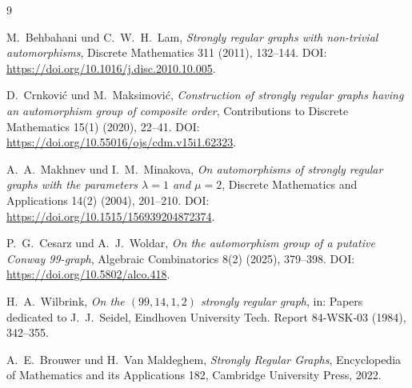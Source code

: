 \documentclass[11pt,a4paper]{article}
\begin{document}
\begin{thebibliography}{9}

M.~Behbahani und C.~W.~H.~Lam,
\emph{Strongly regular graphs with non-trivial automorphisms},
Discrete Mathematics 311 (2011), 132--144.
DOI: \url{https://doi.org/10.1016/j.disc.2010.10.005}.

D.~Crnkovi\'c und M.~Maksimovi\'c,
\emph{Construction of strongly regular graphs having an automorphism group of composite order},
Contributions to Discrete Mathematics 15(1) (2020), 22--41.
DOI: \url{https://doi.org/10.55016/ojs/cdm.v15i1.62323}.

A.~A.~Makhnev und I.~M.~Minakova,
\emph{On automorphisms of strongly regular graphs with the parameters $\lambda=1$ and $\mu=2$},
Discrete Mathematics and Applications 14(2) (2004), 201--210.
DOI: \url{https://doi.org/10.1515/156939204872374}.

P.~G.~Cesarz und A.~J.~Woldar,
\emph{On the automorphism group of a putative Conway 99-graph},
Algebraic Combinatorics 8(2) (2025), 379--398.
DOI: \url{https://doi.org/10.5802/alco.418}.

H.~A.~Wilbrink,
\emph{On the $(99,14,1,2)$ strongly regular graph},
in: Papers dedicated to J.~J.~Seidel, Eindhoven University Tech. Report 84-WSK-03 (1984), 342--355.

A.~E.~Brouwer und H.~Van Maldeghem,
\emph{Strongly Regular Graphs},
Encyclopedia of Mathematics and its Applications 182,
Cambridge University Press, 2022.

\end{thebibliography}
\end{document}
